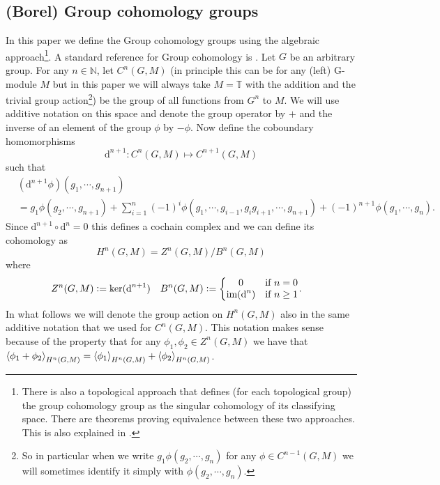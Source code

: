 \documentclass[12pt,a4paper,twoside]{article}
\renewcommand{\d}{\text{d}}
\newcommand{\defeq}{\vcentcolon=}
\let\originalleft\left
\let\originalright\right
\renewcommand{\left}{\mathopen{}\mathclose\bgroup\originalleft}
\renewcommand{\right}{\aftergroup\egroup\originalright}
\newcommand{\TT}{\mathbb T}
\newcommand{\NN}{\mathbb{N}}
\theoremstyle{definition}
\numberwithin{equation}{section}
\begin{document}
\subsection{(Borel) Group cohomology groups}\label{sec:GroupCohomology}
In this paper we define the Group cohomology groups using the algebraic approach\footnote{There is also a topological approach that defines (for each topological group) the group cohomology group as the singular cohomology of its classifying space. There are theorems proving equivalence between these two approaches. This is also explained in \cite{benson1991representations}.}. A standard reference for Group cohomology is \cite{benson1991representations}. Let $G$ be an arbitrary group. For any $n\in\NN$, let $C^n(G,M)$ (in principle this can be for any (left) G-module $M$ but in this paper we will always take $M=\TT$ with the addition and the trivial group action\footnote{So in particular when we write $g_1 \phi(g_2,\cdots,g_n)$ for any $\phi\in C^{n-1}(G,M)$ we will sometimes identify it simply with $\phi(g_2,\cdots,g_n)$.}) be the group of all functions from $G^n$ to $M$. We will use additive notation on this space and denote the group operator by $+$ and the inverse of an element of the group $\phi$ by $-\phi$. Now define the coboundary homomorphisms
\begin{equation}
	\d^{n+1}:C^n(G,M)\mapsto C^{n+1}(G,M)
\end{equation}
such that
\begin{align}
	\nonumber
	&(\d^{n+1}\phi)(g_1,\cdots,g_{n+1})\\
	&=g_1\phi(g_2,\cdots,g_{n+1})+\sum_{i=1}^n (-1)^i \phi(g_1,\cdots,g_{i-1},g_{i}g_{i+1},\cdots,g_{n+1})+(-1)^{n+1}\phi(g_1,\cdots,g_n).
\end{align}
Since $\d^{n+1}\circ\d^{n}=0$ this defines a cochain complex and we can define its cohomology as
\begin{equation}
	H^n(G,M)=Z^n(G,M)/B^n(G,M)
\end{equation}
where
\begin{align}
	Z^n(G,M)&\defeq \ker(\d^{n+1})&B^n(G,M)&\defeq \left\{\begin{matrix}
	0&\text{if }n=0\\\textrm{im}(\d^n)&\text{if }n\geq 1
	\end{matrix}\right. .
\end{align}
In what follows we will denote the group action on $H^n(G,M)$ also in the same additive notation that we used for $C^n(G,M)$. This notation makes sense because of the property that for any $\phi_1,\phi_2\in Z^n(G,M)$ we have that $\expval{\phi_1+\phi_2}_{H^n(G,M)}=\expval{\phi_1}_{H^n(G,M)}+\expval{\phi_2}_{H^n(G,M)}$.
\end{document}
